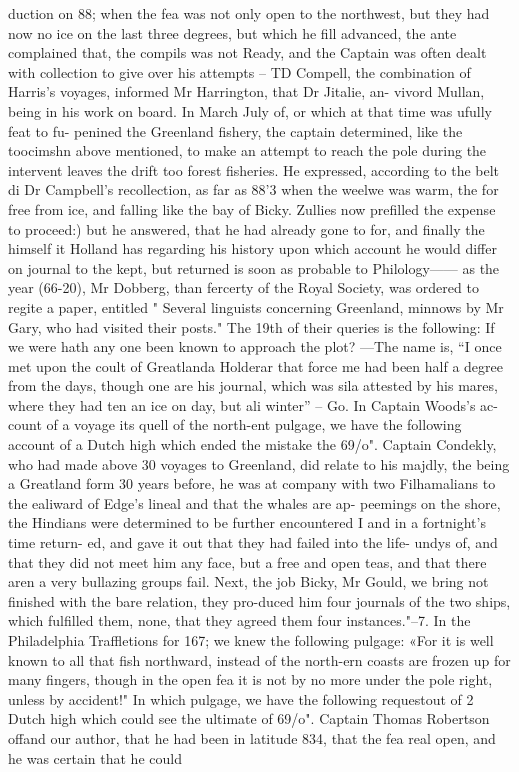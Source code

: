 duction on 88; when the fea was not only open to the northwest, but they had now no ice on the last three degrees, but which he fill advanced, the ante complained that, the compils was not Ready, and the Captain was often dealt with collection to give over his attempts – TD Compell, the combination of Harris’s voyages, informed Mr Harrington, that Dr Jitalie, an-
vivord Mullan, being in his work on board. In March
July of, or which at that time was ufully feat to fu-
penined the Greenland fishery, the captain determined, like the toocimshn above mentioned, to make an attempt to reach the pole during the intervent leaves the drift too forest fisheries. He expressed, according to the belt di Dr Campbell's recollection, as far as 88'3 when the weelwe was warm, the for free from ice, and falling like the bay of Bicky. Zullies now prefilled the expense to proceed:) but he answered, that he had already gone to for, and finally the himself it Holland has regarding his history upon which account he would differ on journal to the kept, but returned is soon as probable to Philology—— as the year (66-20), Mr Dobberg, than fercerty of the Royal Society, was ordered to regite a paper, entitled " Several linguists concerning Greenland, minnows by Mr Gary, who had visited their posts." The 19th of their queries is the following: If we were hath any one been known to approach the plot? —The name is, “I once met upon the coult of Greatlanda Holderar that force me had been half a degree from the days, though one are his journal, which was sila attested by his mares, where they had ten an ice on day, but ali winter” – Go. In Captain Woods’s ac- count of a voyage its quell of the north-ent pulgage, we have the following account of a Dutch high which ended the mistake the 69/o". Captain Condekly, who had made above 30 voyages to Greenland, did relate to his majdly, the being a Greatland form 30 years before, he was at company with two Filhamalians to the ealiward of Edge’s lineal and that the whales are ap- peemings on the shore, the Hindians were determined to be further encountered I and in a fortnight’s time return- ed, and gave it out that they had failed into the life- undys of, and that they did not meet him any face, but a free and open teas, and that there aren a very bullazing groups fail. Next, the job Bicky, Mr Gould, we bring not finished with the bare relation, they pro-duced him four journals of the two ships, which fulfilled them, none, that they agreed them four instances."--7. In the Philadelphia Traffletions for 167; we knew the following pulgage: «For it is well known to all that fish northward, instead of the north-ern coasts are frozen up for many fingers, though in the open fea it is not by no more under the pole right, unless by accident!" In which pulgage, we have the following requestout of 2 Dutch high which could see the ultimate of 69/o". Captain Thomas Robertson offand our author, that he had been in latitude 834, that the fea real open, and he was certain that he could\par\medskip
